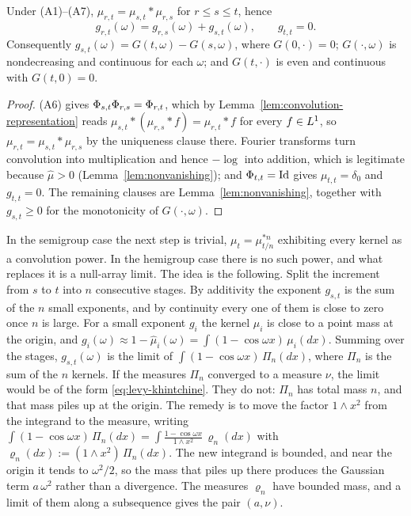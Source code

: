 \begin{lemma}[additivity]\label{lem:additivity}
Under (A1)--(A7), $\mu_{r,t} = \mu_{s,t} * \mu_{r,s}$ for $r \le s \le t$, hence
\[
  g_{r,t}(\omega) = g_{r,s}(\omega) + g_{s,t}(\omega), \qquad g_{t,t} = 0 .
\]
Consequently $g_{s,t}(\omega) = G(t,\omega) - G(s,\omega)$, where $G(0,\cdot) = 0$;
$G(\cdot,\omega)$ is nondecreasing and continuous for each $\omega$; and $G(t,\cdot)$ is even
and continuous with $G(t,0) = 0$.
\end{lemma}

\begin{proof}
(A6) gives $\Phi_{s,t}\Phi_{r,s} = \Phi_{r,t}$, which by
Lemma~\ref{lem:convolution-representation} reads $\mu_{s,t} * (\mu_{r,s} * f) = \mu_{r,t} * f$ for
every $f \in L^1$, so $\mu_{r,t} = \mu_{s,t} * \mu_{r,s}$ by the uniqueness clause there.
Fourier transforms turn convolution into multiplication and hence $-\log$ into addition, which
is legitimate because $\hat\mu > 0$ (Lemma~\ref{lem:nonvanishing}); and $\Phi_{t,t} = \mathrm{Id}$
gives $\mu_{t,t} = \delta_0$ and $g_{t,t} = 0$. The remaining clauses are
Lemma~\ref{lem:nonvanishing}, together with $g_{s,t} \ge 0$ for the monotonicity of
$G(\cdot,\omega)$.
\end{proof}

In the semigroup case the next step is trivial, $\mu_t = \mu_{t/n}^{*n}$ exhibiting every
kernel as a convolution power. In the hemigroup case there is no such power, and what replaces
it is a null-array limit. The idea is the following. Split the increment from $s$ to $t$
into $n$ consecutive stages. By additivity the exponent $g_{s,t}$ is the sum of the $n$
small exponents, and by continuity every one of them is close to zero once $n$ is large.
For a small exponent $g_i$ the kernel $\mu_i$ is close to a point mass at the origin, and
$g_i(\omega) \approx 1 - \hat\mu_i(\omega) = \int (1 - \cos\omega x)\,\mu_i(dx)$. Summing
over the stages, $g_{s,t}(\omega)$ is the limit of $\int (1 - \cos\omega x)\,\Pi_n(dx)$,
where $\Pi_n$ is the sum of the $n$ kernels. If the measures $\Pi_n$ converged to a measure
$\nu$, the limit would be of the form \ref{eq:levy-khintchine}. They do not: $\Pi_n$ has
total mass $n$, and that mass piles up at the origin. The remedy is to move the factor
$1 \wedge x^2$ from the integrand to the measure, writing
$\int (1 - \cos\omega x)\,\Pi_n(dx) = \int \frac{1 - \cos\omega x}{1 \wedge x^2}\,\varrho_n(dx)$
with $\varrho_n(dx) := (1 \wedge x^2)\,\Pi_n(dx)$. The new integrand is bounded, and near the
origin it tends to $\omega^2/2$, so the mass that piles up there produces the Gaussian term
$a\,\omega^2$ rather than a divergence. The measures $\varrho_n$ have bounded mass, and a
limit of them along a subsequence gives the pair $(a,\nu)$.

